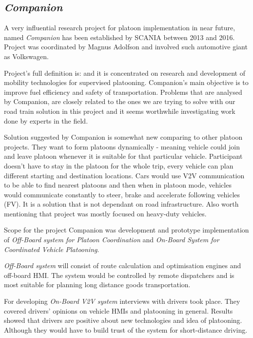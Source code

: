 \subsection{\textit{Companion}}\label{sec:Companion}
% 
A very influential research project for platoon implementation in near future, named \emph{Companion} \cite{2016CompanionProject} has been established by SCANIA between 2013 and 2016. Project was coordinated by Magnus Adolfson and involved such automotive giant as Volkswagen.\par
% 
Project's full definition is:  and it is concentrated on research and development of mobility technologies for supervised platooning. Companion's main objective is to improve fuel efficiency and safety of transportation.%
% 
%
% 
Problems that are analysed by Companion, are closely related to the ones we are trying to solve with our road train solution in this project and it seems worthwhile investigating work done by experts in the field\footnotemark.\par
% 
% 
Solution suggested by Companion is somewhat new comparing to other platoon projects. They want to form platoons dynamically - meaning vehicle could join and leave platoon whenever it is suitable for that particular vehicle. Participant doesn't have to stay in the platoon for the whole trip, every vehicle can plan different starting and destination locations. Cars would use V2V communication to be able to find nearest platoons and then when in platoon mode, vehicles would communicate constantly to steer, brake and accelerate following vehicles (FV). It is a solution that is not dependant on road infrastructure. Also worth mentioning that project was mostly focused on heavy-duty vehicles.\par
% 
Scope for the project Companion was development and prototype implementation of \emph{Off-Board system for Platoon Coordination} and \emph{On-Board System for Coordinated Vehicle Platooning}.\par
% 
\emph{Off-Board system} will consist of route calculation and optimisation engines and off-board HMI. The system would be controlled by remote dispatchers and is most suitable for planning long distance goods transportation.\par
% 
For developing \emph{On-Board V2V system} interviews with drivers took place. They covered drivers' opinions on vehicle HMIs and platooning in general. Results showed that drivers are positive about new technologies and idea of platooning. Although they would have to build trust of the system for short-distance driving.\par
